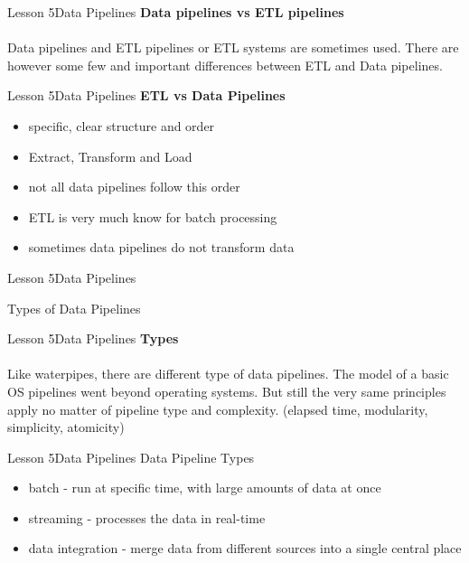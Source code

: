 \documentclass[aspectratio=1610]{beamer}
\begin{document}
\begin{frame}{Lesson 5}{Data Pipelines}
\LARGE
\textbf{Data pipelines vs ETL pipelines}\\~\\
Data pipelines and ETL pipelines or ETL systems are sometimes used. There are
however some few and important differences between ETL and Data pipelines. 
\end{frame}


\begin{frame}{Lesson 5}{Data Pipelines}
\LARGE
\textbf{ETL vs Data Pipelines}\\
\begin{itemize}
	\item specific, clear structure and order
	\item Extract, Transform and Load
	\item not all data pipelines follow this order
	\item ETL is very much know for batch processing
	\item sometimes data pipelines do not transform data
\end{itemize}
\end{frame}


\begin{frame}{Lesson 5}{Data Pipelines}
\Huge
\begin{center}
Types of Data Pipelines
\end{center}
\end{frame}


\begin{frame}{Lesson 5}{Data Pipelines}
\LARGE
\textbf{Types}\\~\\
Like waterpipes, there are different type of data pipelines. The model of a 
basic OS pipelines went beyond operating systems. But still the very same 
principles apply no matter of pipeline type and complexity. (elapsed time, 
modularity, simplicity, atomicity)
\end{frame}


\begin{frame}{Lesson 5}{Data Pipelines}
\LARGE
Data Pipeline Types
\begin{itemize}
    \item batch - run at specific time, with large amounts of data at once
    \item streaming - processes the data in real-time
    \item data integration - merge data from different sources into a single central place
\end{itemize}
\end{frame}
\end{document}
